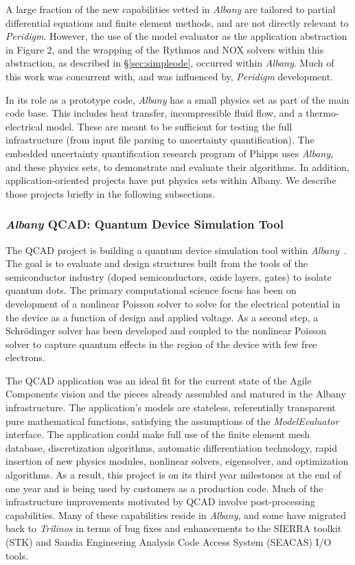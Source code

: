 \documentclass[pdf,ps2pdf,12pt,report]{SANDreport}
\theoremstyle{plain}
\theoremstyle{definition}
\theoremstyle{remark}
\numberwithin{equation}{section}
\begin{document}
A large fraction of the new capabilities vetted in \emph{Albany} are tailored to partial differential equations and finite element methods, and are not directly relevant to \emph{Peridigm}. However, the use of the model evaluator as the application abstraction in Figure 2, and the wrapping of the Rythmos and NOX solvers within this abstraction, as described in \S\ref{sec:simpleode}, occurred within \emph{Albany}. Much of this work was concurrent with, and was influenced by, \emph{Peridigm} development.

In its role as a prototype code, \emph{Albany} has a small physics set as part of the main code base. This includes heat transfer, incompressible fluid flow, and a thermo-electrical model. These are meant to be sufficient for testing the full infrastructure (from input file parsing to uncertainty quantification). The embedded uncertainty quantification research program of Phipps uses \emph{Albany}, and these physics sets, to demonstrate and evaluate their algorithms. In addition, application-oriented projects have put physics sets within Albany. We describe those projects briefly in the following subsections.

\subsubsection{\emph{Albany} QCAD: Quantum Device Simulation Tool} \label{sec:albany:qcad}

The QCAD project is building a quantum device simulation tool within \emph{Albany}~\cite{QCADWebPage:2011}. The goal is to evaluate and design structures built from the tools of the semiconductor industry (doped semiconductors, oxide layers, gates) to isolate quantum dots. The primary computational science focus has been on development of a nonlinear Poisson solver to solve for the electrical potential in the device as a function of design and applied voltage. As a second step, a Schr\"{o}dinger solver has been developed and coupled to the nonlinear Poisson solver to capture quantum effects in the region of the device with few free electrons.

The QCAD application was an ideal fit for the current state of the Agile Components vision and the pieces already assembled and matured in the Albany infrastructure. The application's models are stateless, referentially transparent pure mathematical functions, satisfying the assumptions of the \emph{ModelEvaluator} interface. The application could make full use of the finite element mesh database, discretization algorithms, automatic differentiation technology, rapid insertion of new physics modules, nonlinear solvers, eigensolver, and optimization algorithms. As a result, this project is on its third year milestones at the end of one year and is being used by customers as a production code. Much of the infrastructure improvements motivated by QCAD involve post-processing capabilities.  Many of these capabilities reside in \emph{Albany}, and some have migrated back to \emph{Trilinos} in terms of bug fixes and enhancements to the SIERRA toolkit (STK) and Sandia Engineering Analysis Code Access System (SEACAS) I/O tools.
\end{document}
